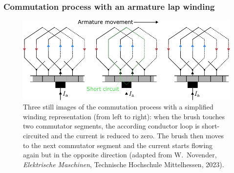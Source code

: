 \begin{frame}
	\frametitle{Commutation process with an armature lap winding}
	\vspace{-0.1cm}
    \begin{figure}
        \centering
        \includegraphics[height=0.6\textheight]{fig/lec03/Commutation_process_lap_winding.pdf}
        \caption{Three still images of the commutation process with a simplified winding representation (from left to right): when the brush touches two commutator segments, the according conductor loop is short-circuited and the current is reduced to zero. The brush then moves to the next commutator segment and the current starts flowing again but in the opposite direction (adapted from W.~Novender, \textit{Elektrische Maschinen}, Technische Hochschule Mittelhessen, 2023).}
    \end{figure}
\end{frame}

